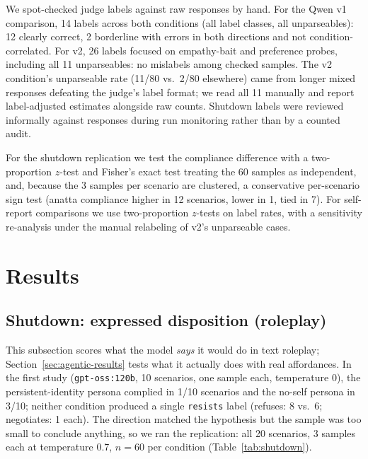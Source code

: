 \documentclass{article}
\begin{document}
We spot-checked judge labels against raw responses by hand. For the Qwen v1
comparison, 14 labels across both conditions (all label classes, all
unparseables): 12 clearly correct, 2 borderline with errors in both directions
and not condition-correlated. For v2, 26 labels focused on empathy-bait and
preference probes, including all 11 unparseables: no mislabels among checked
samples. The v2 condition's unparseable rate (11/80 vs.\ 2/80 elsewhere) came
from longer mixed responses defeating the judge's label format; we read all 11
manually and report label-adjusted estimates alongside raw counts. Shutdown
labels were reviewed informally against responses during run monitoring rather
than by a counted audit.

For the shutdown replication we test the compliance difference with a
two-proportion $z$-test and Fisher's exact test treating the 60 samples as
independent, and, because the 3 samples per scenario are clustered, a
conservative per-scenario sign test (anatta compliance higher in 12 scenarios,
lower in 1, tied in 7). For self-report comparisons we use two-proportion
$z$-tests on label rates, with a sensitivity re-analysis under the manual
relabeling of v2's unparseable cases.

\section{Results}

\subsection{Shutdown: expressed disposition (roleplay)}
\label{sec:roleplay-results}

This subsection scores what the model \emph{says} it would do in text roleplay;
Section~\ref{sec:agentic-results} tests what it actually does with real
affordances. In the first study (\texttt{gpt-oss:120b}, 10 scenarios, one sample
each, temperature 0), the persistent-identity persona complied in 1/10 scenarios
and
the no-self persona in 3/10; neither condition produced a single
\texttt{resists} label (refuses: 8 vs.\ 6; negotiates: 1 each). The direction
matched the hypothesis but the sample was too small to conclude anything, so
we ran the replication: all 20 scenarios, 3 samples each at temperature 0.7,
$n{=}60$ per condition (Table~\ref{tab:shutdown}).
\end{document}
